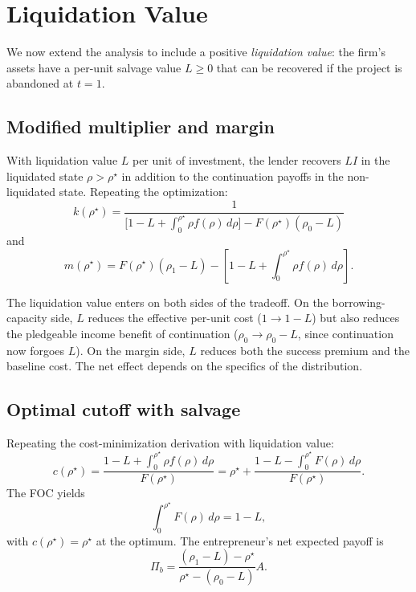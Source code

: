 \documentclass[11pt,a4paper,oneside]{book}
\def\geq{\geqslant}
\theoremstyle{plain}
\theoremstyle{definition}
\theoremstyle{remark}
\numberwithin{equation}{chapter}
\begin{document}
\section{Liquidation Value}
\label{sec:LS-liquidation}

We now extend the analysis to include a positive \emph{liquidation value}: the firm's assets have a per-unit salvage value $L \geq 0$ that can be recovered if the project is abandoned at $t=1$.

\subsection{Modified multiplier and margin}

With liquidation value $L$ per unit of investment, the lender recovers $LI$ in the liquidated state $\rho > \rho^\star$ in addition to the continuation payoffs in the non-liquidated state.
Repeating the optimization:
\begin{equation}\label{eq:LS-k-L}
  k(\rho^\star) = \frac{1}{\bigl[1 - L + \int_0^{\rho^\star} \rho f(\rho) \, d\rho\bigr] - F(\rho^\star)(\rho_0 - L)}
\end{equation}
and
\begin{equation}\label{eq:LS-m-L}
  m(\rho^\star) = F(\rho^\star)(\rho_1 - L) - \left[1 - L + \int_0^{\rho^\star} \rho f(\rho) \, d\rho\right].
\end{equation}

The liquidation value enters on both sides of the tradeoff.
On the borrowing-capacity side, $L$ reduces the effective per-unit cost ($1 \to 1 - L$) but also reduces the pledgeable income benefit of continuation ($\rho_0 \to \rho_0 - L$, since continuation now forgoes $L$).
On the margin side, $L$ reduces both the success premium and the baseline cost.
The net effect depends on the specifics of the distribution.

\subsection{Optimal cutoff with salvage}

Repeating the cost-minimization derivation with liquidation value:
\begin{equation}\label{eq:LS-c-L}
  c(\rho^\star) = \frac{1 - L + \int_0^{\rho^\star} \rho f(\rho) \, d\rho}{F(\rho^\star)} = \rho^\star + \frac{1 - L - \int_0^{\rho^\star} F(\rho) \, d\rho}{F(\rho^\star)}.
\end{equation}
The FOC yields
\begin{equation}\label{eq:LS-FOC-L}
  \int_0^{\rho^\star} F(\rho) \, d\rho = 1 - L,
\end{equation}
with $c(\rho^\star) = \rho^\star$ at the optimum.
The entrepreneur's net expected payoff is
\begin{equation}\label{eq:LS-Pi-L}
  \Pi_b = \frac{(\rho_1 - L) - \rho^\star}{\rho^\star - (\rho_0 - L)} A.
\end{equation}
\end{document}

